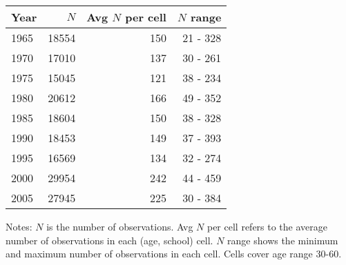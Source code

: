 \begin{tabular}{lrrr}
\hline
Year & $N$  & Avg $N$ per cell  & $N$ range  \\ 
\hline
1965 & 18554  & 150  & 21 - 328  \\ 
1970 & 17010  & 137  & 30 - 261  \\ 
1975 & 15045  & 121  & 38 - 234  \\ 
1980 & 20612  & 166  & 49 - 352  \\ 
1985 & 18604  & 150  & 38 - 328  \\ 
1990 & 18453  & 149  & 37 - 393  \\ 
1995 & 16569  & 134  & 32 - 274  \\ 
2000 & 29954  & 242  & 44 - 459  \\ 
2005 & 27945  & 225  & 30 - 384  \\ 
\hline
\end{tabular}%

 \vspace{5 mm} 
\small 
Notes: $N$ is the number of observations. 
Avg $N$ per cell refers to the average number of observations in each (age, school) cell. 
$N$ range shows the minimum and maximum number of observations in each cell. 
Cells cover age range 30-60.
\normalsize 
